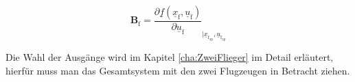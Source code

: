 \begin{equation}
\textbf{B}_\mathrm{f} = \dfrac{\partial \underline{f}(\underline{x}_\mathrm{f},\underline{u}_\mathrm{f})}{\partial \underline{u}_\mathrm{f}}_{|\underline{x}_\mathrm{f_{ap}},\underline{u}_\mathrm{f_{ap}}} 
\end{equation}

Die Wahl der Ausgänge wird im Kapitel \ref{cha:ZweiFlieger} im Detail erläutert, hierfür muss man das Gesamtsystem mit den zwei Flugzeugen in Betracht ziehen.
